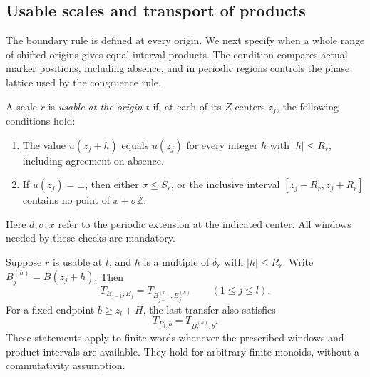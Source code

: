 \subsection{Usable scales and transport of products}

The boundary rule is defined at every origin. We next specify when a
whole range of shifted origins gives equal interval products. The
condition compares actual marker positions, including absence, and in
periodic regions controls the phase lattice used by the congruence rule.

\begin{definition}\label{def:usable}
A scale $r$ is \emph{usable at the origin $t$} if, at each of its $Z$
centers $z_j$, the following conditions hold:
\begin{enumerate}[label=(\roman*)]
\item The value $u(z_j+h)$ equals $u(z_j)$ for every integer $h$ with
$|h|\leq R_r$, including agreement on absence.
\item If $u(z_j)=\bot$, then either $\sigma\leq S_r$, or the inclusive
interval $[z_j-R_r,z_j+R_r]$ contains no point of
$x+\sigma\mathbb Z$.
\end{enumerate}
Here $d,\sigma,x$ refer to the periodic extension at the indicated
center.  All windows needed by these checks are mandatory.
\end{definition}

\begin{lemma}\label{lem:boundary-transport}
Suppose $r$ is usable at $t$, and $h$ is a multiple of $\delta_r$ with
$|h|\leq R_r$.  Write $B_j^{(h)}=B(z_j+h)$.  Then
\begin{equation}\label{eq:transport-intervals}
        T_{B_{j-1},B_j}=T_{B_{j-1}^{(h)},B_j^{(h)}}
                         \qquad(1\leq j\leq l).
\end{equation}
For a fixed endpoint $b\geq z_l+H$, the last transfer also satisfies
\begin{equation}\label{eq:transport-tail}
                         T_{B_l,b}=T_{B_l^{(h)},b}.
\end{equation}
These statements apply to finite words whenever the prescribed
windows and product intervals are available.  They hold for arbitrary
finite monoids, without a commutativity assumption.
\end{lemma}

